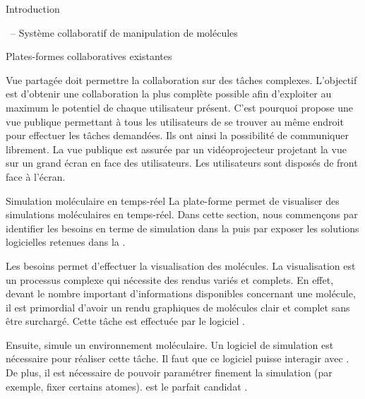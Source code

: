 \documentclass[myfrancais]{mythesis}
\begin{document}
\begin{mypart}{Introduction}
\begin{mychapter}{\myShaddock\ -- Système collaboratif de manipulation de molécules}
\begin{mysection}{Plates-formes collaboratives existantes}
\begin{mysubsection}{Vue partagée}
					\myShaddock doit permettre la collaboration sur des tâches complexes.
					L'objectif est d'obtenir une collaboration la plus complète possible afin d'exploiter au maximum le potentiel de chaque utilisateur présent.
					C'est pourquoi \myShaddock propose une vue publique permettant à tous les utilisateurs de se trouver au même endroit pour effectuer les tâches demandées.
					Ils ont ainsi la possibilité de communiquer librement.
					La vue publique est assurée par un vidéoprojecteur projetant la vue sur un grand écran en face des utilisateurs.
					Les utilisateurs sont disposés de front face à l'écran.
				\end{mysubsection}
			\end{mysection}
			\begin{mysection}{Simulation moléculaire en temps-réel}
				La plate-forme \myShaddock permet de visualiser des simulations moléculaires en temps-réel.
				Dans cette section, nous commençons par identifier les besoins en terme de simulation dans la  puis par exposer les solutions logicielles retenues dans la .
				\begin{mysubsection}{Les besoins}
					\myShaddock permet d'effectuer la visualisation des molécules.
					La visualisation est un processus complexe qui nécessite des rendus variés et complets.
					En effet, devant le nombre important d'informations disponibles concernant une molécule, il est primordial d'avoir un rendu graphiques de molécules clair et complet sans être surchargé.
					Cette tâche est effectuée par le logiciel  .

					Ensuite, \myShaddock simule un environnement moléculaire.
					Un logiciel de simulation est nécessaire pour réaliser cette tâche.
					Il faut que ce logiciel puisse interagir avec .
					De plus, il est nécessaire de pouvoir paramétrer finement la simulation (par exemple, fixer certains atomes).
					 est le parfait candidat .


\end{mysubsection}
\end{mysection}
\end{mychapter}
\end{mypart}
\end{document}
